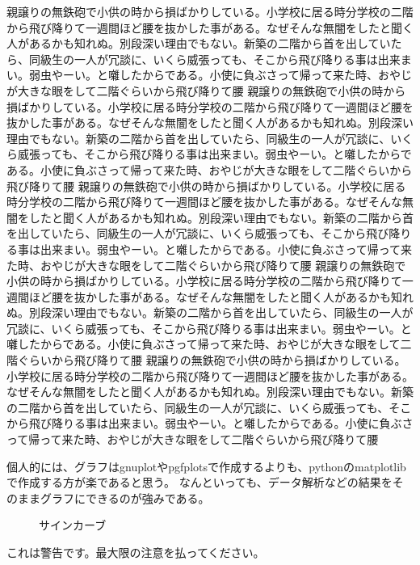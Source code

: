 親譲りの無鉄砲で小供の時から損ばかりしている。小学校に居る時分学校の二階から飛び降りて一週間ほど腰を抜かした事がある。なぜそんな無闇をしたと聞く人があるかも知れぬ。別段深い理由でもない。新築の二階から首を出していたら、同級生の一人が冗談に、いくら威張っても、そこから飛び降りる事は出来まい。弱虫やーい。と囃したからである。小使に負ぶさって帰って来た時、おやじが大きな眼をして二階ぐらいから飛び降りて腰
親譲りの無鉄砲で小供の時から損ばかりしている。小学校に居る時分学校の二階から飛び降りて一週間ほど腰を抜かした事がある。なぜそんな無闇をしたと聞く人があるかも知れぬ。別段深い理由でもない。新築の二階から首を出していたら、同級生の一人が冗談に、いくら威張っても、そこから飛び降りる事は出来まい。弱虫やーい。と囃したからである。小使に負ぶさって帰って来た時、おやじが大きな眼をして二階ぐらいから飛び降りて腰
親譲りの無鉄砲で小供の時から損ばかりしている。小学校に居る時分学校の二階から飛び降りて一週間ほど腰を抜かした事がある。なぜそんな無闇をしたと聞く人があるかも知れぬ。別段深い理由でもない。新築の二階から首を出していたら、同級生の一人が冗談に、いくら威張っても、そこから飛び降りる事は出来まい。弱虫やーい。と囃したからである。小使に負ぶさって帰って来た時、おやじが大きな眼をして二階ぐらいから飛び降りて腰
親譲りの無鉄砲で小供の時から損ばかりしている。小学校に居る時分学校の二階から飛び降りて一週間ほど腰を抜かした事がある。なぜそんな無闇をしたと聞く人があるかも知れぬ。別段深い理由でもない。新築の二階から首を出していたら、同級生の一人が冗談に、いくら威張っても、そこから飛び降りる事は出来まい。弱虫やーい。と囃したからである。小使に負ぶさって帰って来た時、おやじが大きな眼をして二階ぐらいから飛び降りて腰
親譲りの無鉄砲で小供の時から損ばかりしている。小学校に居る時分学校の二階から飛び降りて一週間ほど腰を抜かした事がある。なぜそんな無闇をしたと聞く人があるかも知れぬ。別段深い理由でもない。新築の二階から首を出していたら、同級生の一人が冗談に、いくら威張っても、そこから飛び降りる事は出来まい。弱虫やーい。と囃したからである。小使に負ぶさって帰って来た時、おやじが大きな眼をして二階ぐらいから飛び降りて腰

個人的には、グラフはgnuplotやpgfplotsで作成するよりも、pythonのmatplotlibで作成する方が楽であると思う。
なんといっても、データ解析などの結果をそのままグラフにできるのが強みである。
\begin{figure}[H]
    \centering
    
    \caption{サインカーブ}
    \label{fig:plot}
\end{figure}

\begin{warning}
    これは警告です。最大限の注意を払ってください。
\end{warning}

